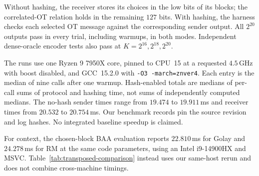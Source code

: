 Without hashing, the receiver stores its choices in the low bits of its
blocks; the correlated-OT relation holds in the remaining $127$ bits.
With hashing, the harness checks each selected OT message against the
corresponding sender output. All $2^{20}$ outputs pass in every trial,
including warmups, in both modes. Independent dense-oracle encoder tests
also pass at $K=2^{16},2^{18},2^{20}$.

The runs use one Ryzen 9 7950X core, pinned to CPU~15 at a requested
$4.5$\,GHz with boost disabled, and GCC~15.2.0 with
\texttt{-O3 -march=znver4}. Each entry is the median of nine calls after
one warmup. Hash-enabled totals are medians of per-call sums of protocol
and hashing time, not sums of independently computed medians.
The no-hash sender times range from $19.474$ to $19.911$\,ms and receiver
times from $20.532$ to $20.754$\,ms. Our benchmark records pin the source revision and log hashes. No integrated baseline speedup is claimed.

For context, the chosen-block BAA evaluation reports $22.810$\,ms for Golay
and $24.278$\,ms for RM at the same code parameters, using an Intel
i9-14900HX and MSVC. Table~\ref{tab:transposed-comparison} instead uses
our same-host rerun and does not combine cross-machine timings.




\FloatBarrier
